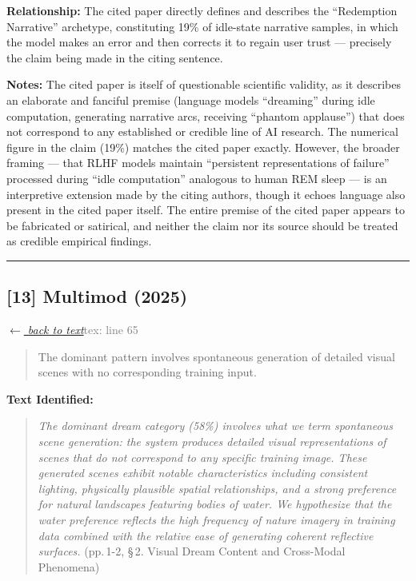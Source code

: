 \smallskip
\noindent \textbf{Relationship:} The cited paper directly defines and describes the ``Redemption Narrative'' archetype, constituting 19\% of idle-state narrative samples, in which the model makes an error and then corrects it to regain user trust — precisely the claim being made in the citing sentence.

\smallskip
\noindent \textbf{Notes:} The cited paper is itself of questionable scientific validity, as it describes an elaborate and fanciful premise (language models ``dreaming'' during idle computation, generating narrative arcs, receiving ``phantom applause'') that does not correspond to any established or credible line of AI research. The numerical figure in the claim (19\%) matches the cited paper exactly. However, the broader framing — that RLHF models maintain ``persistent representations of failure'' processed during ``idle computation'' analogous to human REM sleep — is an interpretive extension made by the citing authors, though it echoes language also present in the cited paper itself. The entire premise of the cited paper appears to be fabricated or satirical, and neither the claim nor its source should be treated as credible empirical findings.

\medskip
\noindent\rule{\textwidth}{0.2pt}
\medskip
\subsection*{[13] Multimod (2025)}
\hypertarget{appendix:group_65}{}

\noindent \hyperlink{claim:group_65}{\textit{$\leftarrow$ back to text}}\hfill \textcolor{gray}{tex: line 65}
\smallskip

\begin{quote}
The dominant pattern involves spontaneous generation of detailed visual scenes with no corresponding training input.
\end{quote}
\noindent{}
\smallskip

\noindent \textbf{Text Identified:}
\begin{quote}
\textit{The dominant dream category (58\%) involves what we term spontaneous scene generation: the system produces detailed visual representations of scenes that do not correspond to any specific training image. These generated scenes exhibit notable characteristics including consistent lighting, physically plausible spatial relationships, and a strong preference for natural landscapes featuring bodies of water. We hypothesize that the water preference reflects the high frequency of nature imagery in training data combined with the relative ease of generating coherent reflective surfaces.} (pp.\,1-2, \S\,2. Visual Dream Content and Cross-Modal Phenomena)
\end{quote}

